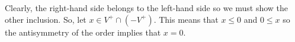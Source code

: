 %
%
\label {sol: if the underlying relation on a preordered vector space is a partial order then we get the cone condition}Clearly, the right-hand side belongs to the left-hand side so we must show the other inclusion. So, let $x \in V^+ \cap (-V^+)$. This means that $x \leq 0$ and $0 \leq x$ so the antisymmetry of the order implies that $x = 0$.
